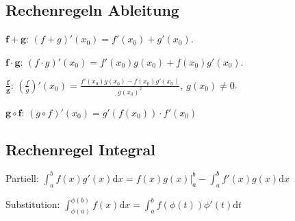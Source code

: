 \subsection{Rechenregeln Ableitung}
\begin{compactdesc}
    \item[$\mathbf{f + g}$:] $(f + g)'(x_0) = f'(x_0) + g'(x_0)$.
    \item[$\mathbf{f \cdot g}$:] $(f \cdot g)'(x_0) = f'(x_0)g(x_0) + f(x_0)g'(x_0)$.
    \item[$\mathbf{\frac{f}{g}}$:] $\left( \frac{f}{g} \right)' (x_0) = \frac{f'(x_0)g(x_0) - f(x_0)g'(x_0)}{g(x_0)^2}, \ g(x_0) \neq 0$.
    \item[$\mathbf{g \circ f}$:] $(g \circ f)'(x_0) = g'(f(x_0)) \cdot f'(x_0)$
\end{compactdesc}

\subsection{Rechenregel Integral}
\begin{compactdesc}
    \item[Partiell:] $\int_{a}^{b} f(x)g'(x) \mathrm{d}x = f(x)g(x)|_a^b - \int_{a}^{b} f'(x)g(x) \mathrm{d}x$
    \item[Substitution:] $\int_{\phi(a)}^{\phi(b)} f(x) \mathrm{d}x = \int_a^b f(\phi(t))\phi'(t) \mathrm{d}t$
\end{compactdesc}

